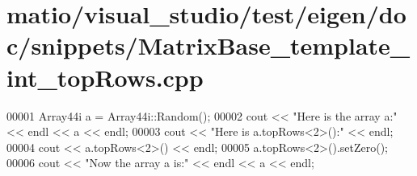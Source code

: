 \hypertarget{matio_2visual__studio_2test_2eigen_2doc_2snippets_2_matrix_base__template__int__top_rows_8cpp_source}{}\section{matio/visual\+\_\+studio/test/eigen/doc/snippets/\+Matrix\+Base\+\_\+template\+\_\+int\+\_\+top\+Rows.cpp}
\label{matio_2visual__studio_2test_2eigen_2doc_2snippets_2_matrix_base__template__int__top_rows_8cpp_source}

\begin{DoxyCode}
00001 Array44i a = Array44i::Random();
00002 cout << \textcolor{stringliteral}{"Here is the array a:"} << endl << a << endl;
00003 cout << \textcolor{stringliteral}{"Here is a.topRows<2>():"} << endl;
00004 cout << a.topRows<2>() << endl;
00005 a.topRows<2>().setZero();
00006 cout << \textcolor{stringliteral}{"Now the array a is:"} << endl << a << endl;
\end{DoxyCode}
